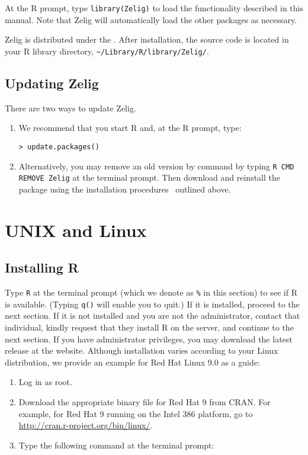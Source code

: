 \documentclass{article}
\begin{document}
At the R prompt, type \texttt{library(Zelig)} to load the
functionality described in this manual.  Note that Zelig will
automatically load the other packages as necessary.
  
Zelig is distributed under the .  After
installation, the source code is located in your R library directory,
{\tt \~{}/Library/R/library/Zelig/}.

\subsection{Updating Zelig}
  
There are two ways to update Zelig.
\begin{enumerate}

\item We recommend that you start R and, at the R prompt, type:
\begin{verbatim}
> update.packages()
\end{verbatim}
  
\item Alternatively, you may remove an old version by command by
  typing {\tt R CMD REMOVE Zelig} at the terminal prompt.  Then
  download and reinstall the package using the installation
  procedures~ outlined above.
\end{enumerate}

\section{UNIX and Linux}\label{ss:unix}

\subsection{Installing R}
Type {\tt R} at the terminal prompt (which we denote as {\tt \%} in
this section) to see if R is available. (Typing \texttt{q()} will
enable you to quit.)  If it is installed, proceed to the next section.
If it is not installed and you are not the administrator, contact that
individual, kindly request that they install R on the server, and
continue to the next section. If you have administrator privileges,
you may download the latest release at the
 website.  Although
installation varies according to your Linux distribution, we provide
an example for Red Hat Linux 9.0 as a guide:

\begin{enumerate}

\item Log in as root.

\item Download the appropriate binary file for Red Hat 9 from CRAN.
  For example, for Red Hat 9 running on the Intel 386 platform, go to
  \url{http://cran.r-project.org/bin/linux/}. 

\item Type the following command at the terminal prompt:

\end{enumerate}
\end{document}
